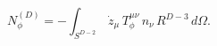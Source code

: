 \begin{equation}
N_{\phi}^{(D)}=-\int_{S^{D-2}}\, \dot{z}_{\mu}\,T_{\phi}^{\mu \nu}\, n_{\nu} 
\, R^{D-3}\, d\Omega.
\end{equation}

